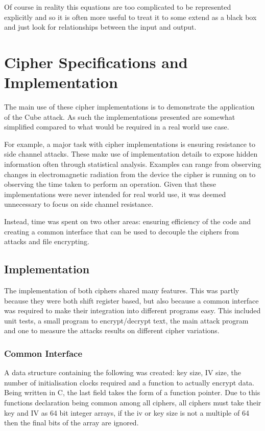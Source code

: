 \documentclass{report}
\let\Oldsection\section
\renewcommand{\section}{\FloatBarrier\Oldsection}
\let\Oldsubsection\subsection
\renewcommand{\subsection}{\FloatBarrier\Oldsubsection}
\begin{document}

Of course in reality this equations are too complicated to be represented explicitly and so it is often more useful to treat it to some extend as a black box and just look for relationships between the input and output.
\chapter{Cipher Specifications  and Implementation}
The main use of these cipher implementations is to demonstrate the application of the Cube attack. As such the implementations presented are somewhat simplified compared to what would be required in a real world use case.

For example, a major task with cipher implementations is ensuring resistance to side channel attacks. These make use of implementation details to expose hidden information often through statistical analysis. Examples can range from observing changes in electromagnetic radiation from the device the cipher is running on\cite{electroSide} to observing the time taken to perform an operation\cite{timingAttack}. Given that these implementations were never intended for real world use, it was deemed unnecessary to focus on side channel resistance.

Instead, time was spent on two other areas: ensuring efficiency of the code and creating a common interface that can be used to decouple the ciphers from attacks and file encrypting.%

\section{Implementation}
The implementation of both ciphers shared many features. This was partly because they were both shift register based, but also because a common interface was required to make their integration into different programs easy. This included unit tests, a small program to encrypt/decrypt text, the main attack program and one to measure the attacks results on different cipher variations.

\subsection{Common Interface}
A data structure containing the following was created: key size, IV size, the number of initialisation clocks required and a function to actually encrypt data. Being written in C, the last field takes the form of a function pointer. Due to this functions declaration being common among all ciphers, all ciphers must take their key and IV as 64 bit integer arrays, if the iv or key size is not a multiple of 64 then the final bits of the array are ignored.
\end{document}
